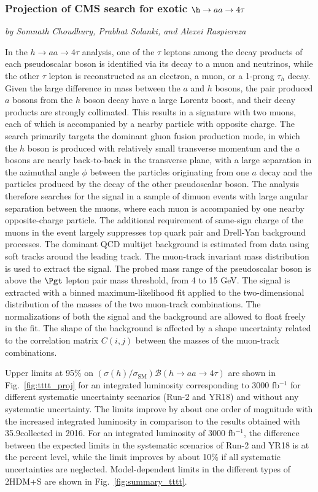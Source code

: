\subsubsection{Projection of CMS search for exotic $\h\to aa \to 4\tau$}
\begin{center}
 {\it{ by Somnath Choudhury, Prabhat Solanki, and Alexei Raspiereza}}
\end{center}

In the $h\to aa\to4\tau$ analysis, one of the $\tau$ leptons among the decay products of each pseudoscalar boson
is identified via its decay to a muon and neutrinos, while the other $\tau$ lepton is reconstructed as an electron, a muon, or a 1-prong $\tau_h$ decay.
Given the large difference in mass between the $a$ and $h$ bosons, the pair produced $a$ bosons
from the $h$ boson decay have a large Lorentz boost,
and their decay products are strongly collimated. This results in a signature with two muons, each of which is
accompanied by a nearby particle with opposite charge.
The search primarily targets the dominant gluon fusion production mode, in which the $h$ boson is produced with
relatively small transverse momentum and the $a$ bosons are nearly back-to-back in the transverse plane,
with a large separation in the azimuthal angle $\phi$ between the particles originating from one $a$ decay
 and the particles produced by the decay of the other pseudoscalar boson.
The analysis therefore searches for the signal in a sample of dimuon events with large angular separation
between the muons, where each muon is accompanied by one nearby opposite-charge particle.
The additional requirement of same-sign charge of the muons in the event largely suppresses top quark pair and Drell-Yan
background processes. The dominant QCD multijet background is estimated from data using soft tracks
around the leading track. The muon-track invariant mass distribution is used to extract the signal.
The probed mass range of the pseudoscalar boson is above the $\Pgt$ lepton pair mass threshold,  from 4 to 15 GeV.
The signal is extracted with a binned maximum-likelihood fit applied to the two-dimensional distribution of the masses
of the two muon-track combinations.
The normalizations of both the signal and the background are allowed to float freely in the fit.
The shape of the background is affected by a shape uncertainty related to the correlation matrix $C(i,j)$ between
the masses of the muon-track combinations.

Upper limits at 95\% \CL on $(\sigma(h)/\sigma_{\textrm{SM}})\mathcal{B}(h \to aa \to 4\tau)$ are shown in Fig.~\ref{fig:tttt_proj} for an integrated luminosity corresponding to 3000 fb$^{-1}$ for different systematic uncertainty scenarios
(Run-2 and YR18) and without any systematic uncertainty. The limits improve by about one order of magnitude with the increased integrated luminosity in comparison to the results obtained with 35.9\fbinv collected in 2016.
For an integrated luminosity of 3000 fb$^{-1}$, the difference between the expected limits in the systematic scenarios
of Run-2 and YR18 is at the percent level, while the limit improves by about 10\% if all systematic uncertainties are neglected. Model-dependent limits in the different types of 2HDM+S are shown in Fig.~\ref{fig:summary_tttt}.

